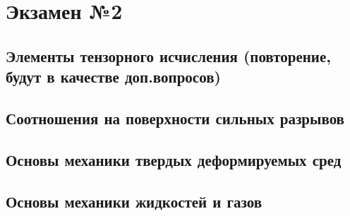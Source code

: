 \documentclass[../mss.tex]{subfiles}
\begin{document}
\part{Экзамен №2}

\chapter{Элементы тензорного исчисления (повторение, будут в качестве доп.вопросов)}







\chapter{Соотношения на поверхности сильных разрывов}





\chapter{Основы механики твердых деформируемых сред}


















\chapter{Основы механики жидкостей и газов}























\end{document}
